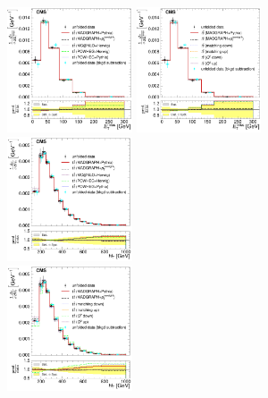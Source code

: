\begin{figure}[hbtp]
    \centering
     \includegraphics[width=0.33\textwidth]{Chapters/04_Analysis/04b_XSections/images/results/fit/8TeV/MET/central/normalised_xsection_combined_different_generators_with_bkgd_subtraction_results.pdf}\hfill
     \includegraphics[width=0.33\textwidth]{Chapters/04_Analysis/04b_XSections/images/results/fit/8TeV/MET/central/normalised_xsection_combined_systematics_shifts_with_bkgd_subtraction_results.pdf}\hfill
     \includegraphics[width=0.33\textwidth]{Chapters/04_Analysis/04b_XSections/images/results/fit/8TeV/HT/central/normalised_xsection_combined_different_generators_with_bkgd_subtraction_results.pdf}\\
     \includegraphics[width=0.33\textwidth]{Chapters/04_Analysis/04b_XSections/images/results/fit/8TeV/HT/central/normalised_xsection_combined_systematics_shifts_with_bkgd_subtraction_results.pdf}\hfill

\end{figure}
